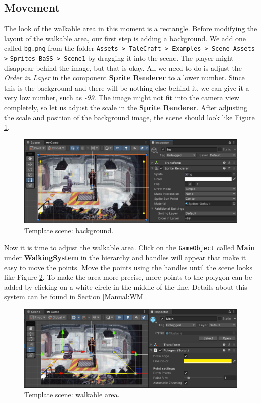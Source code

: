 \subsection{Movement}
The look of the walkable area in this moment is a rectangle. Before modifying the layout of the walkable area, our first step is adding a background. We add one called \verb|bg.png|  from the folder \verb|Assets > TaleCraft > Examples > Scene Assets >| \verb|Sprites-BaSS > Scene1| by dragging it into the scene. The player might disappear behind the image, but that is okay. All we need to do is adjust the \textit{Order in Layer} in the component \textbf{Sprite Renderer} to a lower number. Since this is the background and there will be nothing else behind it, we can give it a very low number, such as \textit{-99}. The image might not fit into the camera view completely, so let us adjust the scale in the \textbf{Sprite Renderer}. After adjusting the scale and position of the background image, the scene should look like Figure \ref{fig:Tutorial-template:bg}.
\begin{figure}[H]
\centering
\includegraphics[width=1\linewidth]{img/User doc/image_2025-07-08_104224540.png}
\caption{Template scene: background.}
\label{fig:Tutorial-template:bg}
\end{figure}

Now it is time to adjust the walkable area. Click on the \verb|GameObject| called \textbf{Main} under \textbf{WalkingSystem} in the hierarchy and handles will appear that make it easy to move the points. Move the points using the handles until the scene looks like Figure \ref{fig:Tutorial-template:main}. To make the area more precise, more points to the polygon can be added by clicking on a white circle in the middle of the line. Details about this system can be found in Section \ref{Manual:WM}.

\begin{figure}[H]
\centering
\includegraphics[width=1\linewidth]{img/User doc/image_2025-07-08_104843701.png}
\caption{Template scene: walkable area.}
\label{fig:Tutorial-template:main}
\end{figure}

